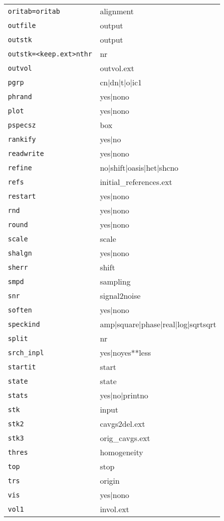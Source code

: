 \begin{tabular}{ll}
\texttt{oritab=oritab}&{alignment}\\
\texttt{outfile}&{output}\\
\texttt{outstk}&{output}\\
\texttt{outstk=<keep.ext>nthr}&{nr}\\
\texttt{outvol}&{outvol.ext}\\
\texttt{pgrp}&{cn|dn|t|o|i{c1}}\\
\texttt{phrand}&{yes|no{no}}\\
\texttt{plot}&{yes|no{no}}\\
\texttt{pspecsz}&{box}\\
\texttt{rankify}&{yes|no}\\
\texttt{readwrite}&{yes|no{no}}\\
\texttt{refine}&{no|shift|oasis|het|shc{no}}\\
\texttt{refs}&{initial\_references.ext}\\
\texttt{restart}&{yes|no{no}}\\
\texttt{rnd}&{yes|no{no}}\\
\texttt{round}&{yes|no{no}}\\
\texttt{scale}&{scale}\\
\texttt{shalgn}&{yes|no{no}}\\
\texttt{sherr}&{shift}\\
\texttt{smpd}&{sampling}\\
\texttt{snr}&{signal2noise}\\
\texttt{soften}&{yes|no{no}}\\
\texttt{speckind}&{amp|square|phase|real|log|sqrt{sqrt}}\\
\texttt{split}&{nr}\\
\texttt{srch\_inpl}&{yes|no{yes}**less}\\
\texttt{startit}&{start}\\
\texttt{state}&{state}\\
\texttt{stats}&{yes|no|print{no}}\\
\texttt{stk}&{input}\\
\texttt{stk2}&{cavgs2del.ext}\\
\texttt{stk3}&{orig\_cavgs.ext}\\
\texttt{thres}&{homogeneity}\\
\texttt{top}&{stop}\\
\texttt{trs}&{origin}\\
\texttt{vis}&{yes|no{no}}\\
\texttt{vol1}&{invol.ext}\\

\end{tabular}
